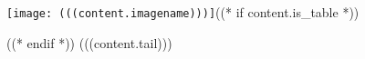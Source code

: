 \texttt{[image: (((content.imagename)))]}((* if content.is_table *))\par\vspace{-5pt}((* endif *))
(((content.tail)))